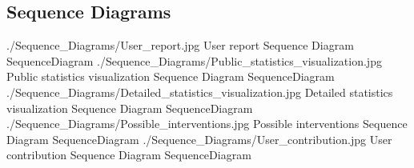 \documentclass[../../../RASD.tex]{subfiles}
\begin{document}
\subsection{Sequence Diagrams\label{sect:3.2.4}}

\image {10cm} {./Sequence_Diagrams/User_report.jpg} {User report Sequence Diagram} {SequenceDiagram}
\image {7cm} {./Sequence_Diagrams/Public_statistics_visualization.jpg} {Public statistics visualization Sequence Diagram} {SequenceDiagram}
\image {8cm} {./Sequence_Diagrams/Detailed_statistics_visualization.jpg} {Detailed statistics visualization Sequence Diagram} {SequenceDiagram}
\image {5cm} {./Sequence_Diagrams/Possible_interventions.jpg} {Possible interventions Sequence Diagram} {SequenceDiagram}
\image {6cm} {./Sequence_Diagrams/User_contribution.jpg} {User contribution Sequence Diagram} {SequenceDiagram} 
\end{document}
